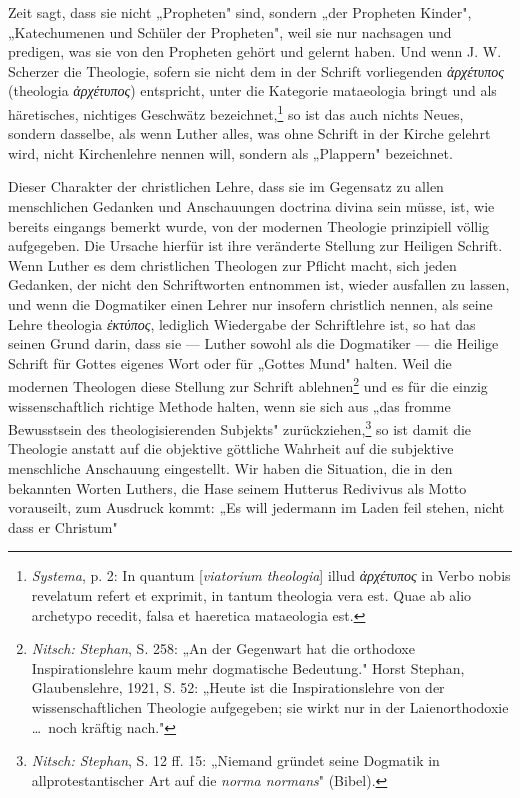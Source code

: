 Zeit sagt, dass sie nicht „Propheten" sind, sondern „der Propheten Kinder", „Katechumenen und Schüler der Propheten", weil sie nur nachsagen und predigen, was sie von den Propheten gehört und gelernt haben. Und wenn J. W. Scherzer die Theologie, sofern sie nicht dem in der Schrift vorliegenden \textit{ἀρχέτυπος} (theologia \textit{ἀρχέτυπος}) entspricht, unter die Kategorie mataeologia bringt und als häretisches, nichtiges Geschwätz bezeichnet,\footnote{\textit{Systema}, p. 2: In quantum [\textit{viatorium theologia}] illud \textit{ἀρχέτυπος} in Verbo nobis revelatum refert et exprimit, in tantum theologia vera est. Quae ab alio archetypo recedit, falsa et haeretica mataeologia est.} so ist das auch nichts Neues, sondern dasselbe, als wenn Luther alles, was ohne Schrift in der Kirche gelehrt wird, nicht Kirchenlehre nennen will, sondern als „Plappern" bezeichnet.\par Dieser Charakter der christlichen Lehre, dass sie im Gegensatz zu allen menschlichen Gedanken und Anschauungen doctrina divina sein müsse, ist, wie bereits eingangs bemerkt wurde, von der modernen Theologie prinzipiell völlig aufgegeben. Die Ursache hierfür ist ihre veränderte Stellung zur Heiligen Schrift. Wenn Luther es dem christlichen Theologen zur Pflicht macht, sich jeden Gedanken, der nicht den Schriftworten entnommen ist, wieder ausfallen zu lassen, und wenn die Dogmatiker einen Lehrer nur insofern christlich nennen, als seine Lehre theologia \textit{ἐκτύπος}, lediglich Wiedergabe der Schriftlehre ist, so hat das seinen Grund darin, dass sie --- Luther sowohl als die Dogmatiker --- die Heilige Schrift für Gottes eigenes Wort oder für „Gottes Mund" halten. Weil die modernen Theologen diese Stellung zur Schrift ablehnen\footnote{\textit{Nitsch: Stephan}, S. 258: „An der Gegenwart hat die orthodoxe Inspirationslehre kaum mehr dogmatische Bedeutung." Horst Stephan, Glaubenslehre, 1921, S. 52: „Heute ist die Inspirationslehre von der wissenschaftlichen Theologie aufgegeben; sie wirkt nur in der Laienorthodoxie \dots\ noch kräftig nach."} und es für die einzig wissenschaftlich richtige Methode halten, wenn sie sich aus „das fromme Bewusstsein des theologisierenden Subjekts" zurückziehen,\footnote{\textit{Nitsch: Stephan}, S. 12 ff. 15: „Niemand gründet seine Dogmatik in allprotestantischer Art auf die \textit{norma normans}" (Bibel).} so ist damit die Theologie anstatt auf die objektive göttliche Wahrheit auf die subjektive menschliche Anschauung eingestellt. Wir haben die Situation, die in den bekannten Worten Luthers, die Hase seinem Hutterus Redivivus als Motto vorauseilt, zum Ausdruck kommt: „Es will jedermann im Laden feil stehen, nicht dass er Christum"